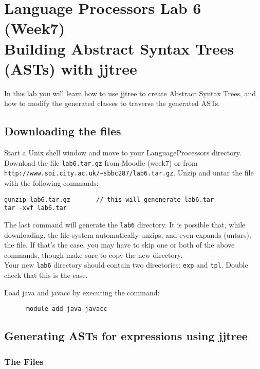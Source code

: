 \documentclass{article}
\begin{document}
\thispagestyle{empty}

\newcommand{\negra}[1]{\textbf{#1}}

\section*{Language Processors Lab 6 (Week7)\\
 Building Abstract Syntax Trees (ASTs) with jjtree}

\medskip\noindent In this lab you will learn how to use jjtree to create Abstract Syntax Trees, and how to modify the generated classes to traverse the generated ASTs.

\subsection*{Downloading the files}

Start a Unix shell window and move to your LanguageProcessors directory. Download the file {\tt lab6.tar.gz} from Moodle (week7) or from \verb+http://www.soi.city.ac.uk/~sbbc287/lab6.tar.gz+. Unzip and untar the file with the following commands:

\begin{verbatim}
gunzip lab6.tar.gz       // this will genenerate lab6.tar
tar -xvf lab6.tar
\end{verbatim}

The last command will generate the {\tt lab6} directory. It is possible that, while downloading, the file system automatically unzips, and even expands (untars), the file. If that's the case, you may have to skip one or both of the above commands, though make sure to copy the new directory. \\

Your new {\tt lab6} directory should contain two directories: {\tt exp} and {\tt tpl}. Double check that this is the case.

Load java and javacc by executing the command:
\begin{verbatim}
      module add java javacc
\end{verbatim}

\subsection*{Generating ASTs for expressions using jjtree}

\subsubsection*{The Files}
\end{document}
